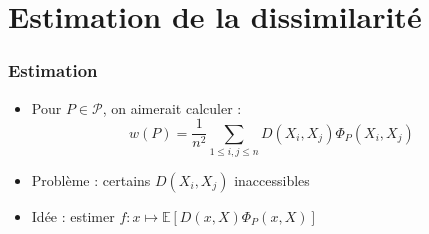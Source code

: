 \documentclass[a4paper, c]{beamer}
\begin{document}
\section{Estimation de la dissimilarit\'e}
\begin{frame}
    \frametitle{Estimation}

    \begin{itemize}
        \item Pour $P \in \mathcal{P}$, on aimerait calculer :
        \[
            w(P) = \frac{1}{n^2} \sum_{1 \leq i,j \leq n} D(X_i, X_j) \Phi_P(X_i, X_j)
        \]
        \item Problème : certains $D(X_i, X_j)$ inaccessibles
        \item Id\'ee : estimer $f : x \mapsto \mathbb{E}\left[ D(x, X) \Phi_P(x, X) \right]$

    \end{itemize}
\end{frame}
\end{document}
